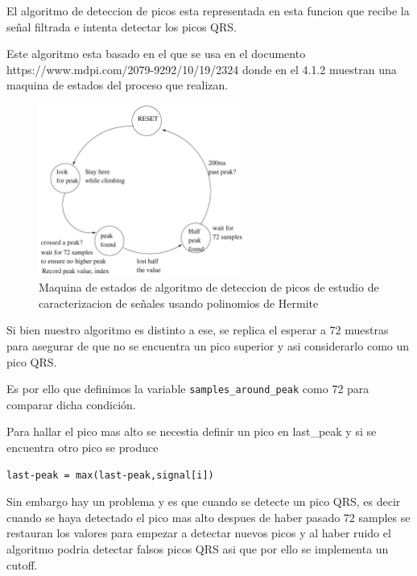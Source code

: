 El algoritmo de deteccion de picos esta representada en esta funcion que 
recibe la señal filtrada e intenta detectar los picos QRS.

Este algoritmo esta basado en el que se usa en el documento  https://www.mdpi.com/2079-9292/10/19/2324 
donde en el 4.1.2 muestran una maquina de estados del proceso que realizan.

\begin{figure}[h!]
    \centering
    \includegraphics[width=0.6\textwidth]{./Images/img_algoritmo/fsm_mdpi.png}
    \caption{Maquina de estados de algoritmo de deteccion de picos de estudio de caracterizacion de señales usando polinomios de Hermite}
    \label{fig:fsm_mpdi}
\end{figure}

Si bien nuestro algoritmo es distinto a ese, se replica el esperar a 72 muestras
para asegurar de que no se encuentra un pico superior y asi considerarlo como un pico QRS.

Es por ello que definimos la variable \lstinline|samples_around_peak| como 72 para comparar dicha condición.

Para hallar el pico mas alto se necestia definir un pico en last\_peak y si se encuentra otro pico se produce

\lstset{language=python, breaklines=true, basicstyle=\footnotesize}
\begin{lstlisting}[frame=single]
last-peak = max(last-peak,signal[i])
\end{lstlisting}

Sin embargo hay un problema y es que cuando se detecte un pico QRS, es decir cuando se haya detectado el pico 
mas alto despues de haber pasado 72 samples se restauran los valores para empezar a detectar nuevos picos y al
haber ruido el algoritmo podria detectar falsos picos QRS asi que por ello se implementa un cutoff.

